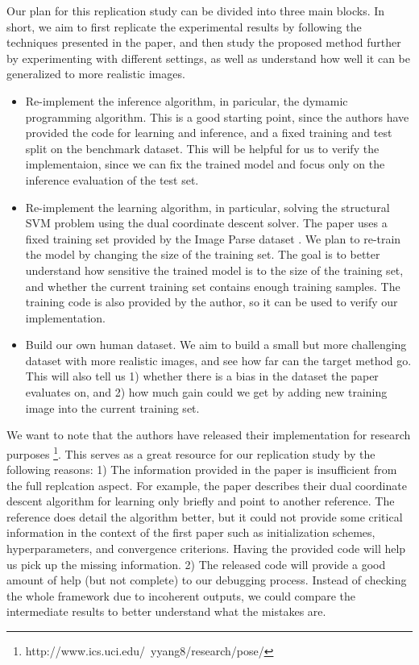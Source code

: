 \documentclass[10pt,twocolumn,letterpaper]{article}
\begin{document}
Our plan for this replication study can be divided into three main blocks. In short, we aim to first replicate the experimental results by following the techniques presented in the paper, and then study the proposed method further by experimenting with different settings, as well as understand how well it can be generalized to more realistic images.
\begin{itemize}
  \item Re-implement the inference algorithm, in paricular, the dymamic programming algorithm. This is a good starting point, since the authors have provided the code for learning and inference, and a fixed training and test split on the benchmark dataset. This will be helpful for us to verify the implementaion, since we can fix the trained model and focus only on the inference evaluation of the test set.
  \item Re-implement the learning algorithm, in particular, solving the structural SVM problem using the dual coordinate descent solver. The paper uses a fixed training set provided by the Image Parse dataset \cite{Ramanan_NIPS2006}. We plan to re-train the model by changing the size of the training set. The goal is to better understand how sensitive the trained model is to the size of the training set, and whether the current training set contains enough training samples. The training code is also provided by the author, so it can be used to verify our implementation.
  \item Build our own human dataset. We aim to build a small but more challenging dataset with more realistic images, and see how far can the target method go. This will also tell us 1) whether there is a bias in the dataset the paper evaluates on, and 2) how much gain could we get by adding new training image into the current training set.
\end{itemize}

We want to note that the authors have released their implementation for research purposes \footnote{http://www.ics.uci.edu/~yyang8/research/pose/}. This serves as a great resource for our replication study by the following reasons: 1) The information provided in the paper is insufficient from the full replcation aspect. For example, the paper describes their dual coordinate descent algorithm for learning only briefly and point to another reference. The reference does detail the algorithm better, but it could not provide some critical information in the context of the first paper such as initialization schemes, hyperparameters, and convergence criterions. Having the provided code will help us pick up the missing information. 2) The released code will provide a good amount of help (but not complete) to our debugging process. Instead of checking the whole framework due to incoherent outputs, we could compare the intermediate results to better understand what the mistakes are.
\end{document}
